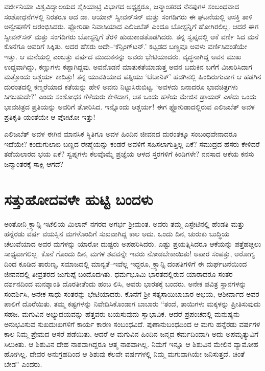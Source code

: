 ವರ್ಜೀನಿಯಾ ವಿಶ್ವವಿದ್ಯಾಲಯದ ಸೈಕಿಯಾಟ್ರಿ ವಿಭಾಗದ ಅಧ್ಯಕ್ಷರೂ, ಜನ್ಮಾಂತರದ ನೆನಪುಗಳ ಸಂಬಂಧವಾದ ಸಂಶೋಧನೆಗಳಲ್ಲಿ ನಿರತರೂ ಆದ ಡಾ. ಆಯಾನ್ ಸ್ವೀವನ್​ಸನ್ ಮತ್ತು ಸಂಗಡಿಗರು ಈ ಘಟನೆಯಲ್ಲಿ ಆಸಕ್ತಿ ತಾಳಿ ಅನ್ವೇಷಣೆಗೆ ಆರಂಭಿಸಿದರು. ಫ್ಲೋರಿಡಾ ನಿವಾಸಿಯಾದ ಎಲಿಜಬೆತ್ ಎಂದೂ ಬೋಸ್ಟನ್ನಿಗೆ ಹೋಗಿರಲಿಲ್ಲ. ಆದರೆ ಈಗ ಸ್ವೀವನ್​ಸನ್ ಮತ್ತು ಸಂಗಡಿಗರು ಬೋಸ್ಟನ್ನಿಗೆ ತೆರಳಿ ಹುಡುಕಾಡತೊಡಗಿದರು. ತನ್ನ ಸ್ವಪ್ನದಲ್ಲಿ ಆಕೆ ವರ್ಣಿ ಸಿದ ಮನೆ ಕೊನೆಗೂ ಅವರಿಗೆ ಸಿಕ್ಕಿತು. ಅದರ ಹೆಸರು ಅದೇ–‘ಕೆನ್ಸಿಂಗ್​ಟನ್.’ ಕಟ್ಟಡದ ಬಣ್ಣವೂ ಅವಳು ವರ್ಣಿಸಿದಂತೆಯೇ ಇತ್ತು. ಆ ಮನೆಯಲ್ಲಿ ಎಂಬತ್ತು ವರ್ಷದ ಮುದುಕನನ್ನು ಅವರು ಭೇಟಿಯಾದರು. ವೃದ್ಧನಾಗಿದ್ದ ಅವನ ಮುಖ ಉದ್ದವಾಗಿದ್ದು, ಕಣ್ಣುಗಳು ಕಪ್ಪಾಗಿದ್ದವು. ಅವನೊಡನೆ ಮಾತುಕತೆಯಾಡುತ್ತ ಅವನ ಬದುಕಿನ ಬಗೆಗೆ ವಿಚಾರಿಸಿದಾಗ ಮತ್ತೊಂದು ಆಶ್ಚರ್ಯ ಕಾದಿತ್ತು! ತನ್ನ ಯುವತಿಯಾದ ಪತ್ನಿಯು ‘ಟೆಟಾನಿಕ್​’ ಹಡಗಿನಲ್ಲಿ ಹಿಂದಿರುಗುವಾಗ ಆ ಹಡಗಿನ ದುರಂತದಲ್ಲಿ ಕಣ್ಮರೆಯಾದ ಕತೆಯನ್ನು ಹೇಳಿ ಅವನು ನಿಟ್ಟುಸಿರುಬಿಟ್ಟ. ‘ಅವಳದು ಏನಾದರೂ ಭಾವಚಿತ್ರಗಳು ಸಿಗಬಹುದೇ?’ ಎಂದು ಸಂಶೋಧಕ ಗೆಳೆಯರು ಕೇಳಿದಾಗ, ಆತ ಒಂದು ಹಳೆಯ ಮೇಜಿನ ಡ್ರಾಯರ್ ಎಳೆದು ಒಂದು ಭಾವಚಿತ್ರದ ಪ್ರತಿಯನ್ನು ಅವರಿಗೆ ತೋರಿಸಿದ. ಇನ್ನೊಂದು ಆಶ್ಚರ್ಯ! ಈಗ ಫ್ಲೋರಿಡಾದಲ್ಲಿರುವ ಎಲಿಜಬೆತ್ ಅವಳ ಪ್ರತಿಕೃತಿ ಯಂತೆಯೇ ಆ ಪೋಟೋ ಇತ್ತು!

ಎಲಿಜಬೆತ್ ಅವಳ ಈಗಿನ ಮಾನಸಿಕ ಸ್ಥಿತಿಗೂ ಅವಳ ಹಿಂದಿನ ಜೀವನದ ದುರಂತಕ್ಕೂ ಸಂಬಂಧವೇನಾದರೂ ಇದೆಯೇ? ಕಂದುಗುಲಾಬಿ ಬಣ್ಣದ ರೇಷ್ಮೆಯನ್ನು ಕಂಡರೆ ಅವಳಿಗೆ ಸಹಿಸಲಾಗುತ್ತಿಲ್ಲ ಏಕೆ? ಸಮುದ್ರದ ಹೆಸರು ಕೇಳಿದರೆ ತಡೆಯಲಾರದ ಭಯ ಏಕೆ? ಸ್ವಪ್ನಗಳು ಕೆಲವೊಮ್ಮೆ ಪ್ರಜ್ಞೆಯ ಆಳದ ಸ್ತರಗಳಿಗೆ ಕಿಂಡಿಗಳೇ? ನನಸಾದ ಆಕೆಯ ಕನಸು ಜನ್ಮಾಂತರಕ್ಕೆ ಸಾಕ್ಷಿ ಆಗದೆ?


\section{ಸತ್ತುಹೋದವಳೇ ಹುಟ್ಟಿ ಬಂದಳು}

ಅಂತೋನಿ ಕ್ರ್ಯಾನ್ಸಿ ಇಟೆಲಿಯ ಮಿಲಾನ್ ನಗರದ ಅಗರ್ಭ ಶ‍್ರೀಮಂತ. ಅವರು ತಮ್ಮ ಎಸ್ಟೇಟಿನಲ್ಲಿ ಹೆಂಡತಿ ಮತ್ತು ಹನ್ನೆರಡು ವರ್ಷ ವಯಸ್ಸಿನ ಮಗಳೊಂದಿಗೆ ಸುಖವಾಗಿದ್ದ ಕಾಲ ಅದು. ಒಂದು ದಿನ, ಚುರುಕು ಬುದ್ಧಿಯ ಚೆಲುವೆಯಾದ ಅವರ ಮಗಳನ್ನು ಯಾರೋ ದುಷ್ಟರು ಅಪಹರಿಸಿದರು. ಎಷ್ಟು ಪ್ರಯತ್ನಿಸಿದರೂ ಆಕೆಯನ್ನು ಪತ್ತೆಹಚ್ಚಲು ಸಾಧ್ಯವಾಗಲಿಲ್ಲ. ಕೊನೆ ಗೊಂದು ದಿನ, ಮಗಳ ಶವವನ್ನೇ ಇವರು ನೋಡಬೇಕಾಯಿತು! ಅಪಾರ ಸಂಪತ್ತು, ಆರೋಗ್ಯ ದಿಂದ ಕೂಡಿದ ತಾರುಣ್ಯ, ಸಮಾಜದಲ್ಲಿ ಮಾನ್ಯತೆ–ಇವೆಲ್ಲ ಇದ್ದರೂ, ಕ್ರ್ಯಾನ್ಸಿ ದಂಪತಿಗಳಿಗೆ ಈ ದುರ್ಘಟನೆಯಿಂದ ಜೀವನದಲ್ಲಿ ತೀವ್ರತರದ ಜುಗುಪ್ಸೆ ಬಂದೊದಗಿತು. ಧರ್ಮಭೂಮಿ ಭಾರತದಲ್ಲಿರುವ ಯಾರಾದರೂ ಸಂತರ ದರ್ಶನದಿಂದ ಮನಶ್ಶಾಂತಿ ದೊರತೀತೆಂದು ಹಂಬ ಲಿಸಿ, ಅವರು ಭಾರತಕ್ಕೆ ಬಂದರು. ಅನೇಕ ಪವಿತ್ರ ಸ್ಥಾನಗಳನ್ನು ಸಂದರ್ಶಿಸಿ, ಅನೇಕ ಸಾಧು ಸಂತರನ್ನು ಭೇಟಿಯಾದರು. ಕೊನೆಗೆ ಶ‍್ರೀ ಸತ್ಯಸಾಯಿಬಾಬಾರ ಅಭಯ, ಆಶೀರ್ವಾದ ಅವರ ಪಾಲಿಗೆ ದೊರೆಯಿತು. ತಮ್ಮ ಕಷ್ಟಗಳನ್ನು ನಿವೇದಿಸಿಕೊಂಡಾಗ ಬಾಬಾರು “ತಂದೆ, ತಾಯಿಗಳು ಮಕ್ಕಳನ್ನು ಪ್ರೀತಿಸುವುದು ಸಹಜ. ಮಗುವಿನ ಅಭ್ಯುದಯವನ್ನು ಹೆತ್ತವರು ಬಯಸುವುದು ಸ್ವಾಭಾವಿಕ. ಆದರೆ ಪ್ರಪಂಚದಲ್ಲಿ ಮನುಷ್ಯನು ಅನುಭವಿಸುವ ಸುಖದುಃಖಗಳಿಗೆ ಕಾರ್ಯ ಕಾರಣ ಸಂಬಂಧವಿದೆ. ಪುಣಾನುಬಂಧದಿಂದ ಆ ಮಗು ಹನ್ನೆರಡು ವರ್ಷಗಳ ಕಾಲ ನಿಮ್ಮ ಪ್ರೇಮದ ಆಸರೆ ಪಡೆಯಿತು. ಆದರೆ ಆ ಮಗುವಿನ ಹಿಂದಿನ ಜನ್ಮದ ಕರ್ಮದಿಂದಾಗಿ ಅದು ಅಪಮೃತ್ಯುವಿಗೆ ಸಿಲುಕಿತು. ಆ ಶಿಶುವಿನ ದೇಹ ನಾಶವಾಗಿದ್ದರೂ ಆತ್ಮ ನಾಶವಾಗಿಲ್ಲ. ನಿಮಗೆ ಇನ್ನೂ ಆ ಶಿಶುವಿನ ಮೇಲಿನ ವ್ಯಾಮೋಹ ಹೋಗಿಲ್ಲ. ದೇವರ ಅನುಗ್ರಹದಿಂದ ಆ ಶಿಶುವು ಕೆಲವೇ ವರ್ಷಗಳಲ್ಲಿ ನಿಮ್ಮ ಮಗುವಾಗಿಯೇ ಜನಿಸುತ್ತದೆ. ಚಿಂತೆ ಬೇಡ” ಎಂದರು.

